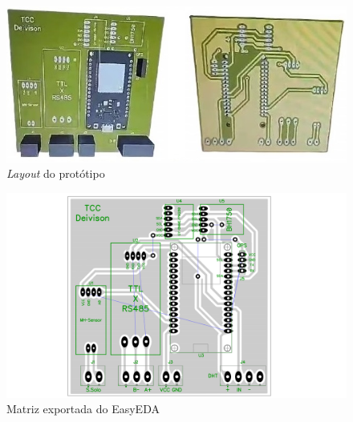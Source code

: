 \newpage

\begin{figure}[!htb] \centering
  \caption{\textit{Layout} do protótipo} \label{figura:pcb-layout}
  \begin{varwidth}{\linewidth}
    \includegraphics[width=16cm]{figuras/prototype-pcb.jpg}
  \end{varwidth}
\end{figure}

\begin{figure}[!htb] \centering
  \caption{Matriz exportada do EasyEDA} \label{figura:pcb-scheme}
  \begin{varwidth}{\linewidth}
    \includegraphics[width=16cm]{figuras/pcb-scheme.png}
  \end{varwidth}
\end{figure}

